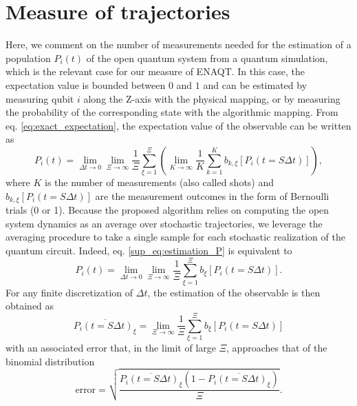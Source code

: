 \documentclass[12pt, amsmath, amssymb, graphicx]{iopart}
\begin{document}
\section{Measure of trajectories} \label{app:measure}
Here, we comment on the number of measurements needed for the estimation of a population $P_i(t)$ of the open quantum system from a quantum simulation, which is the relevant case for our measure of ENAQT. In this case, the expectation value is bounded between $0$ and $1$ and can be estimated by measuring qubit $i$ along the Z-axis with the physical mapping, or by measuring the probability of the corresponding state with the algorithmic mapping.
From eq. \ref{eq:exact_expectation}, the expectation value of the observable can be written as 
%
\begin{equation} \label{sup_eq:estimation_P}
    P_i(t) = \lim_{\Delta t \rightarrow 0} \lim_{\Xi \rightarrow \infty} \frac{1}{\Xi} \sum_{\xi=1}^{\Xi} \left( \lim_{K \rightarrow \infty} \frac{1}{K} \sum_{k=1}^{K} b_{k,\xi} \left[ P_i(t=S\Delta t) \right] \right),
\end{equation}
%
where $K$ is the number of measurements (also called shots) and $b_{k,\xi} \left[ P_i(t=S\Delta t) \right]$ are the measurement outcomes in the form of Bernoulli trials (0 or 1). Because the proposed algorithm relies on computing the open system dynamics as an average over stochastic trajectories, we leverage the averaging procedure to take a single sample for each stochastic realization of the quantum circuit. Indeed, eq. \ref{sup_eq:estimation_P} is equivalent to
%
\begin{equation}
     P_i(t) = \lim_{\Delta t \rightarrow 0} \lim_{\Xi \rightarrow \infty} \frac{1}{\Xi} \sum_{\xi=1}^{\Xi} b_{\xi} \left[ P_i(t=S\Delta t) \right].
\end{equation}
%
For any finite discretization of $\Delta t$, the estimation of the observable is then obtained as
%
\begin{equation}
    \overline{P_i(t=S\Delta t)_\xi} = \lim_{\Xi \rightarrow \infty} \frac{1}{\Xi} \sum_{\xi=1}^{\Xi} b_{\xi} \left[ P_i(t=S\Delta t) \right]
\end{equation}
%
with an associated error that, in the limit of large $\Xi$, approaches that of the binomial distribution 
%
\begin{equation}
    \text{error} = \sqrt{\frac{\overline{P_i(t=S\Delta t)_\xi} \left( 1 - \overline{P_i(t=S\Delta t)_\xi} \right)}{\Xi}}.
\end{equation}
%
\end{document}
